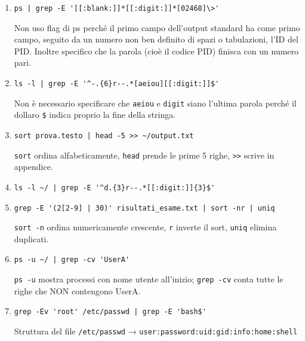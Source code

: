 \documentclass{report}
\begin{document}
\begin{enumerate}

\item 
\begin{verbatim}
ps | grep -E '[[:blank:]]*[[:digit:]]*[02468]\>'
\end{verbatim}
Non uso flag di ps perché il primo campo dell'output standard ha come primo campo, seguito da un numero non ben definito di spazi o tabulazioni, l’ID del PID. Inoltre specifico che la parola (cioè il codice PID) finisca con un numero pari.

\item 
\begin{verbatim}
ls -l | grep -E '^-.{6}r--.*[aeiou][[:digit:]]$'
\end{verbatim}
Non è necessario specificare che \texttt{aeiou} e \texttt{digit} siano l'ultima parola perché il dollaro \texttt{\$} indica proprio la fine della stringa.

\item 
\begin{verbatim}
sort prova.testo | head -5 >> ~/output.txt
\end{verbatim}
\texttt{sort} ordina alfabeticamente, \texttt{head} prende le prime 5 righe, \texttt{>>} scrive in appendice.

\item 
\begin{verbatim}
ls -l ~/ | grep -E '^d.{3}r--.*[[:digit:]]{3}$'
\end{verbatim}

\item 
\begin{verbatim}
grep -E '(2[2-9] | 30)' risultati_esame.txt | sort -nr | uniq
\end{verbatim}
\texttt{sort -n} ordina numericamente crescente, \texttt{r} inverte il sort, \texttt{uniq} elimina duplicati.

\item 
\begin{verbatim}
ps -u ~/ | grep -cv 'UserA'
\end{verbatim}
\texttt{ps -u} mostra processi con nome utente all’inizio; \texttt{grep -cv} conta tutte le righe che NON contengono UserA.

\item 
\begin{verbatim}
grep -Ev 'root' /etc/passwd | grep -E 'bash$'
\end{verbatim}
Struttura del file \texttt{/etc/passwd} → \texttt{user:password:uid:gid:info:home:shell}


\end{enumerate}
\end{document}
